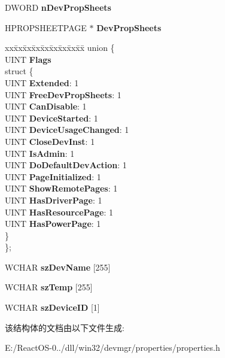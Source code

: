 \begin{DoxyCompactItemize}
D\+W\+O\+RD {\bfseries n\+Dev\+Prop\+Sheets}
\item 
\mbox{\label{struct___d_e_v_a_d_v_p_r_o_p___i_n_f_o_a7f24291dcef46f7ca3bed0143e9c309b}} 
H\+P\+R\+O\+P\+S\+H\+E\+E\+T\+P\+A\+GE $\ast$ {\bfseries Dev\+Prop\+Sheets}
\item 
\mbox{\label{struct___d_e_v_a_d_v_p_r_o_p___i_n_f_o_a83af1cb652f2f32515bd5154e12e1e27}} 
\begin{tabbing}
xx\=xx\=xx\=xx\=xx\=xx\=xx\=xx\=xx\=\kill
union \{\\
\>UINT {\bfseries Flags}\\
\mbox{\label{union___d_e_v_a_d_v_p_r_o_p___i_n_f_o_1_1_0D363_ab2a0209f443447f10290b994236bb0ac}} 
\>struct \{\\
\>\>UINT {\bfseries Extended}: 1\\
\>\>UINT {\bfseries FreeDevPropSheets}: 1\\
\>\>UINT {\bfseries CanDisable}: 1\\
\>\>UINT {\bfseries DeviceStarted}: 1\\
\>\>UINT {\bfseries DeviceUsageChanged}: 1\\
\>\>UINT {\bfseries CloseDevInst}: 1\\
\>\>UINT {\bfseries IsAdmin}: 1\\
\>\>UINT {\bfseries DoDefaultDevAction}: 1\\
\>\>UINT {\bfseries PageInitialized}: 1\\
\>\>UINT {\bfseries ShowRemotePages}: 1\\
\>\>UINT {\bfseries HasDriverPage}: 1\\
\>\>UINT {\bfseries HasResourcePage}: 1\\
\>\>UINT {\bfseries HasPowerPage}: 1\\
\>\} \\
\}; \\

\end{tabbing}\item 
\mbox{\label{struct___d_e_v_a_d_v_p_r_o_p___i_n_f_o_a4870381d0d58fd0c82b53a121dbf2a66}} 
W\+C\+H\+AR {\bfseries sz\+Dev\+Name} \mbox{[}255\mbox{]}
\item 
\mbox{\label{struct___d_e_v_a_d_v_p_r_o_p___i_n_f_o_a1642fb5460dc227dc9d6c5a46eecf37a}} 
W\+C\+H\+AR {\bfseries sz\+Temp} \mbox{[}255\mbox{]}
\item 
\mbox{\label{struct___d_e_v_a_d_v_p_r_o_p___i_n_f_o_ab8b2231d19b3450096497d809a180818}} 
W\+C\+H\+AR {\bfseries sz\+Device\+ID} \mbox{[}1\mbox{]}
\end{DoxyCompactItemize}


该结构体的文档由以下文件生成\+:\begin{DoxyCompactItemize}
\item 
E\+:/\+React\+O\+S-\/0../dll/win32/devmgr/properties/properties.\+h\end{DoxyCompactItemize}
